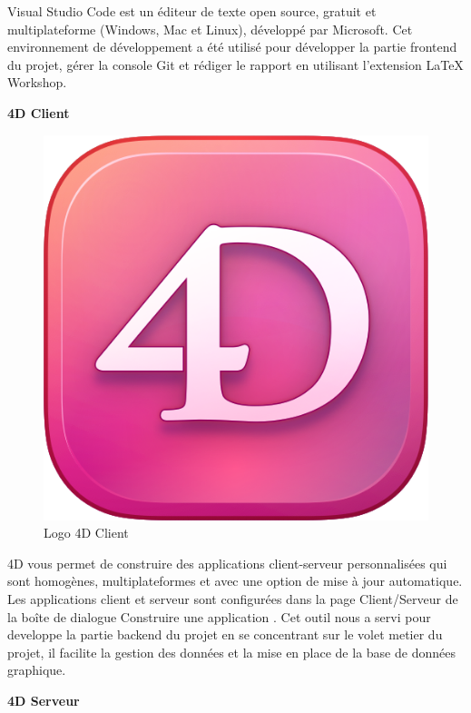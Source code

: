 Visual Studio Code est un éditeur de texte open source,
 gratuit et multiplateforme (Windows, Mac et Linux), 
 développé par Microsoft\cite{vsCode}. Cet environnement de développement 
 a été utilisé pour développer la partie frontend du projet, gérer la console Git et rédiger le rapport en utilisant l'extension LaTeX Workshop.
\newline

\large 
\textbf{4D Client}

\begin{figure}[htbp]
   \centering
   \includegraphics[scale=0.2]{Images/4dcl.png} 
   \caption{Logo 4D Client\cite{4d}}
   \label{fig:4dcl}
\end{figure}

4D vous permet de construire des applications client-serveur 
personnalisées qui sont homogènes, multiplateformes et avec 
une option de mise à jour automatique. Les applications 
client et serveur sont configurées dans la page Client/Serveur 
de la boîte de dialogue Construire une application \cite{4d}.
Cet outil nous a servi pour developpe la partie backend du projet 
en se concentrant sur le volet metier du projet, il facilite la gestion
des données et la mise en place de la base de données graphique.
\newline

\large 
\textbf{4D Serveur}

